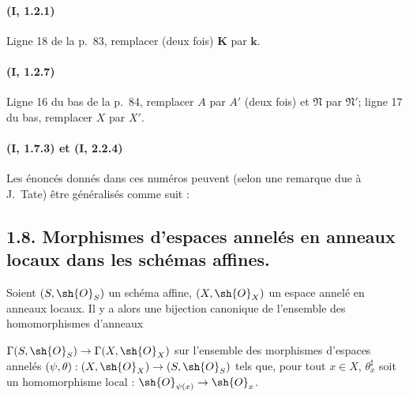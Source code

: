 \paragraph{(I, 1.2.1)}
Ligne 18 de la p.~83, remplacer (deux fois) $\boldsymbol{K}$ par $\boldsymbol{k}$.

\paragraph{(I, 1.2.7)}
Ligne 16 du bas de la p.~84, remplacer $A$ par $A'$ (deux fois) et
$\mathfrak N$ par $\mathfrak N'$; ligne 17 du bas, remplacer $X$ par
$X'$.

\paragraph{(I, 1.7.3) \textmd{et} (I, 2.2.4)}
Les énoncés donnés dans ces numéros peuvent (selon une remarque due à
J.~Tate) être généralisés comme suit :

\subsection*{1.8. Morphismes d'espaces annelés en anneaux locaux dans les schémas affines.}
\label{ega2:addendum:subsection:I.1.8-fr}

\begin{proposition}[1.8.1]
\label{ega2:addendum:I.1.8.1-fr}
Soient $(S,\sh{O}_S)$ un schéma affine, $(X,\sh{O}_X)$ un espace annelé
en anneaux locaux. Il y a alors une bijection canonique de l'ensemble
des homomorphismes d'anneaux
$\Gamma(S,\sh{O}_S)\to\Gamma(X,\sh{O}_X)$
sur l'ensemble des morphismes d'espaces annelés
$(\psi,\theta):(X,\sh{O}_X)\to(S,\sh{O}_S)$ tels que, pour tout
$x\in X$, $\theta_x^\sharp$ soit un
homomorphisme local : $\sh{O}_{\psi(x)}\to\sh{O}_x$.
\end{proposition}

